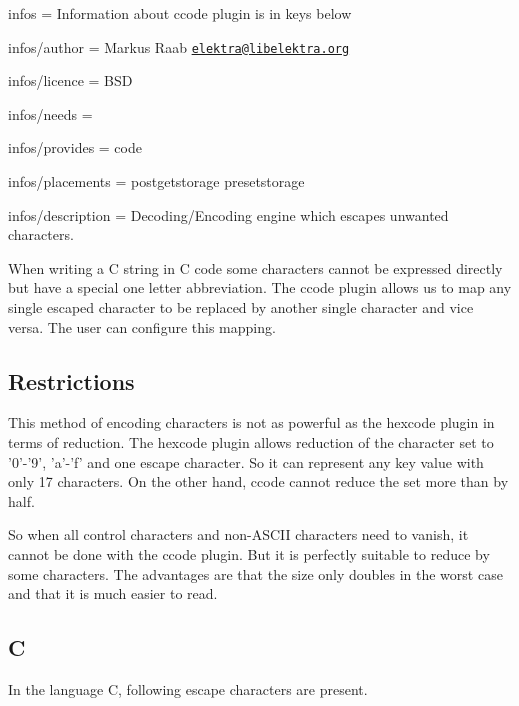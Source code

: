 
\begin{DoxyItemize}
\item infos = Information about ccode plugin is in keys below
\item infos/author = Markus Raab \href{mailto:elektra@libelektra.org}{\tt elektra@libelektra.\+org}
\item infos/licence = B\+S\+D
\item infos/needs =
\item infos/provides = code
\item infos/placements = postgetstorage presetstorage
\item infos/description = Decoding/\+Encoding engine which escapes unwanted characters.
\end{DoxyItemize}

When writing a C string in C code some characters cannot be expressed directly but have a special one letter abbreviation. The ccode plugin allows us to map any single escaped character to be replaced by another single character and vice versa. The user can configure this mapping.

\subsection*{Restrictions}

This method of encoding characters is not as powerful as the hexcode plugin in terms of reduction. The hexcode plugin allows reduction of the character set to '0'-\/'9', 'a'-\/'f' and one escape character. So it can represent any key value with only 17 characters. On the other hand, ccode cannot reduce the set more than by half.

So when all control characters and non-\/\+A\+S\+C\+I\+I characters need to vanish, it cannot be done with the ccode plugin. But it is perfectly suitable to reduce by some characters. The advantages are that the size only doubles in the worst case and that it is much easier to read.

\subsection*{C}

In the language C, following escape characters are present.


